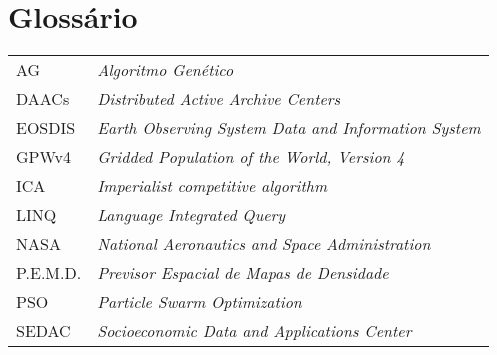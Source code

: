 \chapter*{Glossário}

\begin{tabular}{l p{}}
  AG & \emph{Algoritmo Genético} \\
  DAACs & \emph{Distributed Active Archive Centers} \\
  EOSDIS & \emph{Earth Observing System Data and Information System} \\
  GPWv4 & \emph{Gridded Population of the World, Version 4} \\
  ICA & \emph{Imperialist competitive algorithm} \\
  LINQ & \emph{Language Integrated Query} \\
  NASA & \emph{National Aeronautics and Space Administration} \\
  P.E.M.D. & \emph{Previsor Espacial de Mapas de Densidade} \\
  PSO & \emph{Particle Swarm Optimization} \\
  SEDAC & \emph{Socioeconomic Data and Applications Center} \\
  
\end{tabular}